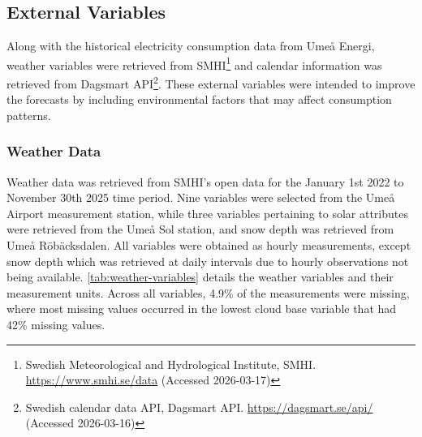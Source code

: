 

\subsection{External Variables}

Along with the historical electricity consumption data from Umeå Energi, weather variables were retrieved from SMHI\footnote{Swedish Meteorological and Hydrological Institute, SMHI. \url{https://www.smhi.se/data} (Accessed 2026-03-17)} and calendar information was retrieved from Dagsmart API\footnote{Swedish calendar data API, Dagsmart API. \url{https://dagsmart.se/api/} (Accessed 2026-03-16)}. These external variables were intended to improve the forecasts by including environmental factors that may affect consumption patterns.

\subsubsection{Weather Data}\label{sec:weather-data}

Weather data was retrieved from SMHI's open data for the January 1st 2022 to November 30th 2025 time period. Nine variables were selected from the Umeå Airport measurement station, while three variables pertaining to solar attributes were retrieved from the Umeå Sol station, and snow depth was retrieved from Umeå Röbäcksdalen. All variables were obtained as hourly measurements, except snow depth which was retrieved at daily intervals due to hourly observations not being available. \autoref{tab:weather-variables} details the weather variables and their measurement units. Across all variables, 4.9\% of the measurements were missing, where most missing values occurred in the lowest cloud base variable that had 42\% missing values.

